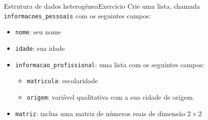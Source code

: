 \documentclass[
  10pt,
  ignorenonframetext,
]{beamer}
\providecommand{\tightlist}{%
  \setlength{\itemsep}{0pt}\setlength{\parskip}{0pt}}\usepackage{longtable,booktabs,array}
\begin{document}
\begin{frame}[fragile]{Estrutura de dados heterogênea\newline Exercício}
\protect\hypertarget{estrutura-de-dados-heteroguxeaneaexercuxedcio}{}
Crie uma lista, chamada \texttt{informacoes\_pessoais} com os seguintes
campos:

\begin{itemize}
\tightlist
\item
  \texttt{nome}: seu nome
\item
  \texttt{idade}: sua idade
\item
  \texttt{informacao\_profissional}: uma lista com os seguintes campos:

  \begin{itemize}
  \tightlist
  \item
    \texttt{matricula}: escolaridade
  \item
    \texttt{origem}: variável qualitativa com a sua cidade de origem.
  \end{itemize}
\item
  \texttt{matriz}: inclua uma matriz de números reais de dimensão
  \(2\times 2\)
\end{itemize}
\end{frame}
\end{document}
